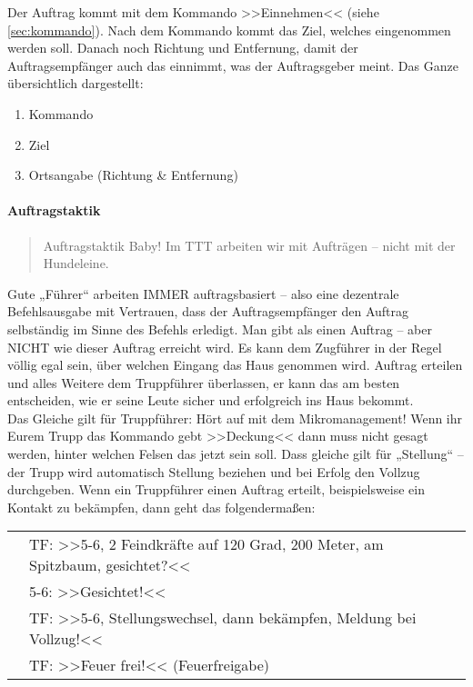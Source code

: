 Der Auftrag kommt mit dem Kommando >>Einnehmen<< (siehe \ref{sec:kommando}). Nach dem Kommando kommt das Ziel, welches eingenommen werden soll. Danach noch Richtung und Entfernung, damit der Auftragsempfänger auch das einnimmt, was der Auftragsgeber meint. Das Ganze übersichtlich dargestellt:

\begin{enumerate}
	\item Kommando
	\item Ziel
	\item Ortsangabe (Richtung \& Entfernung)
\end{enumerate}

\paragraph*{Auftragstaktik}\hfil
\begin{quote}
	\glqq Auftragstaktik Baby! Im \ac{TTT} arbeiten wir mit Aufträgen -- nicht mit der Hundeleine.\grqq
\end{quote}
Gute „Führer“ arbeiten IMMER auftragsbasiert -- also eine dezentrale Befehlsausgabe mit Vertrauen, dass der Auftragsempfänger den Auftrag selbständig im Sinne des Befehls erledigt. Man gibt als einen Auftrag – aber NICHT wie dieser Auftrag erreicht wird. Es kann dem Zugführer in der Regel völlig egal sein, über welchen Eingang das Haus genommen wird. Auftrag erteilen und alles Weitere dem Truppführer überlassen, er kann das am besten entscheiden, wie er seine Leute sicher und erfolgreich ins Haus bekommt.\\

Das Gleiche gilt für Truppführer: Hört auf mit dem Mikromanagement! Wenn ihr Eurem Trupp das Kommando gebt >>Deckung<< dann muss nicht gesagt werden, hinter welchen Felsen das jetzt sein soll. Dass gleiche gilt für „Stellung“ – der Trupp wird automatisch Stellung beziehen und bei Erfolg den Vollzug durchgeben. Wenn ein Truppführer einen Auftrag erteilt, beispielsweise ein Kontakt zu bekämpfen, dann geht das folgendermaßen:\\
\begin{tabular}{ll}
	& TF: >>5-6, 2 Feindkräfte auf 120 Grad, 200 Meter, am Spitzbaum, gesichtet?<<\\
	& 5-6: >>Gesichtet!<<\\
	& TF: >>5-6, Stellungswechsel, dann bekämpfen, Meldung bei Vollzug!<<\\
	& TF: >>Feuer frei!<< (Feuerfreigabe)\\
\end{tabular}


